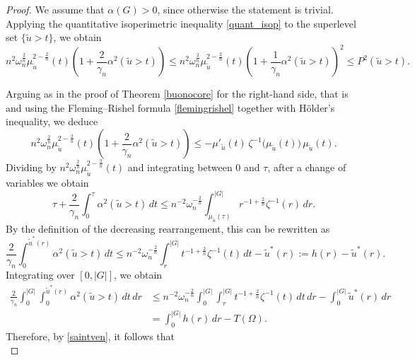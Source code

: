 \documentclass[oneside,a4paper,11pt,notitlepage]{article}
\theoremstyle{definition}
\theoremstyle{plain}
\theoremstyle{definition}
\begin{document}
\begin{proof}
We assume that $\alpha(G)>0$, since otherwise the statement is trivial. 
Applying the quantitative isoperimetric inequality \eqref{quant_isop} to the superlevel set $\{\tilde u > t\}$, we obtain
\begin{equation*}
n^2\omega_n^{\frac{2}{n}}\mu_{\tilde u}^{2-\frac{2}{n}}(t)\left(1+\frac{2}{\gamma_n}\alpha^2(\tilde u>t)\right)
\leq 
n^2\omega_n^{\frac{2}{n}}\mu_{\tilde u}^{2-\frac{2}{n}}(t)\left(1+\frac{1}{\gamma_n}\alpha^2(\tilde u>t)\right)^2
\leq P^2(\tilde u>t).
\end{equation*}

Arguing as in the proof of Theorem \ref{buonocore}  for the right-hand side, that is and using the Fleming--Rishel formula \eqref{flemingrishel} together with H\"older's inequality, we deduce
\begin{equation*}
n^2\omega_n^{\frac{2}{n}}\mu_{\tilde u}^{2-\frac{2}{n}}(t)
\left(1+\frac{2}{\gamma_n}\alpha^2(\tilde u>t)\right)
\leq -\mu'_{\tilde u}(t)\,\zeta^{-1}\!\bigl(\mu_{\tilde u}(t)\bigr)\,\mu_{\tilde u}(t).
\end{equation*}
Dividing by $n^2\omega_n^{\frac{2}{n}}\mu_{\tilde u}^{2-\frac{2}{n}}(t)$ and integrating between $0$ and $\tau$, after a change of variables we obtain
\begin{equation*}
\tau + \frac{2}{\gamma_n}\int_0^\tau \alpha^2(\tilde u>t)\,dt
\leq n^{-2}\omega_n^{-\frac{2}{n}}
\int_{\mu_{\tilde u}(\tau)}^{|G|} r^{-1+\frac{2}{n}}\zeta^{-1}(r)\,dr.
\end{equation*}
By the definition of the decreasing rearrangement, this can be rewritten as
\begin{equation*}
\frac{2}{\gamma_n}\int_0^{\tilde u^*(r)} \alpha^2(\tilde u>t)\,dt
\leq n^{-2}\omega_n^{-\frac{2}{n}}
\int_r^{|G|} t^{-1+\frac{2}{n}}\zeta^{-1}(t)\,dt - \tilde u^*(r)
:= h(r)-\tilde u^*(r).
\end{equation*}
Integrating over $[0,|G|]$, we obtain
\begin{equation*}
\begin{aligned}
\frac{2}{\gamma_n}\int_0^{|G|}\int_0^{\tilde u^*(r)} \alpha^2(\tilde u>t)\,dt\,dr
&\leq n^{-2}\omega_n^{-\frac{2}{n}}
\int_0^{|G|}\int_r^{|G|} t^{-1+\frac{2}{n}}\zeta^{-1}(t)\,dt\,dr
- \int_0^{|G|}\tilde u^*(r)\,dr \\
&= \int_0^{|G|} h(r)\,dr - T(\Omega).
\end{aligned}
\end{equation*}
Therefore, by \eqref{saintven}, it follows that
\begin{equation}\label{common41e54}

\end{equation}
\end{proof}
\end{document}
